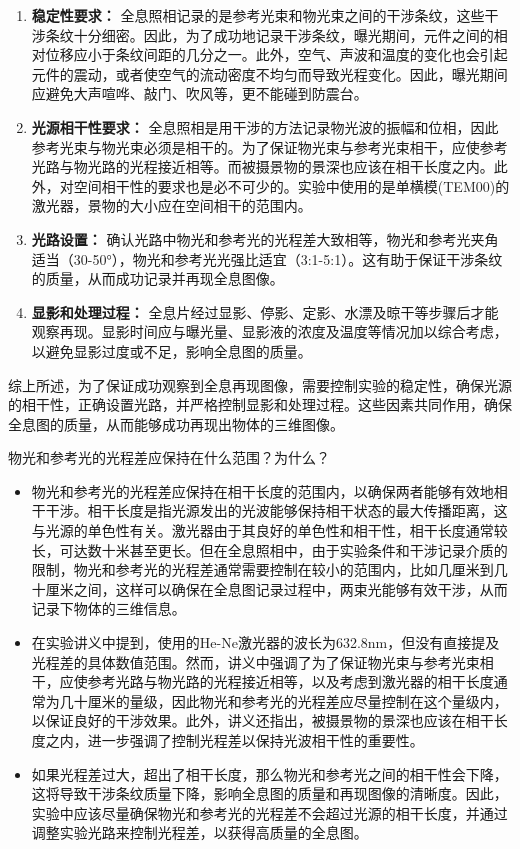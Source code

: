 \documentclass[dvipsnames, svgnames,a4paper,11pt]{article}
\begin{document}
	\begin{enumerate}
		\item \textbf{稳定性要求：} 全息照相记录的是参考光束和物光束之间的干涉条纹，这些干涉条纹十分细密。因此，为了成功地记录干涉条纹，曝光期间，元件之间的相对位移应小于条纹间距的几分之一。此外，空气、声波和温度的变化也会引起元件的震动，或者使空气的流动密度不均匀而导致光程变化。因此，曝光期间应避免大声喧哗、敲门、吹风等，更不能碰到防震台。
		
		\item \textbf{光源相干性要求：} 全息照相是用干涉的方法记录物光波的振幅和位相，因此参考光束与物光束必须是相干的。为了保证物光束与参考光束相干，应使参考光路与物光路的光程接近相等。而被摄景物的景深也应该在相干长度之内。此外，对空间相干性的要求也是必不可少的。实验中使用的是单横模(TEM00)的激光器，景物的大小应在空间相干的范围内。
		
		\item \textbf{光路设置：} 确认光路中物光和参考光的光程差大致相等，物光和参考光夹角适当（30-50°），物光和参考光光强比适宜（3:1-5:1）。这有助于保证干涉条纹的质量，从而成功记录并再现全息图像。
		
		\item \textbf{显影和处理过程：} 全息片经过显影、停影、定影、水漂及晾干等步骤后才能观察再现。显影时间应与曝光量、显影液的浓度及温度等情况加以综合考虑，以避免显影过度或不足，影响全息图的质量。
	\end{enumerate}
	
	综上所述，为了保证成功观察到全息再现图像，需要控制实验的稳定性，确保光源的相干性，正确设置光路，并严格控制显影和处理过程。这些因素共同作用，确保全息图的质量，从而能够成功再现出物体的三维图像。
	
	
	\begin{question}
		物光和参考光的光程差应保持在什么范围？为什么？
	\end{question}
	\begin{itemize}
		\item 物光和参考光的光程差应保持在相干长度的范围内，以确保两者能够有效地相干干涉。相干长度是指光源发出的光波能够保持相干状态的最大传播距离，这与光源的单色性有关。激光器由于其良好的单色性和相干性，相干长度通常较长，可达数十米甚至更长。但在全息照相中，由于实验条件和干涉记录介质的限制，物光和参考光的光程差通常需要控制在较小的范围内，比如几厘米到几十厘米之间，这样可以确保在全息图记录过程中，两束光能够有效干涉，从而记录下物体的三维信息。
		
		\item 在实验讲义中提到，使用的He-Ne激光器的波长为632.8nm，但没有直接提及光程差的具体数值范围。然而，讲义中强调了为了保证物光束与参考光束相干，应使参考光路与物光路的光程接近相等，以及考虑到激光器的相干长度通常为几十厘米的量级，因此物光和参考光的光程差应尽量控制在这个量级内，以保证良好的干涉效果。此外，讲义还指出，被摄景物的景深也应该在相干长度之内，进一步强调了控制光程差以保持光波相干性的重要性。
		
		\item 如果光程差过大，超出了相干长度，那么物光和参考光之间的相干性会下降，这将导致干涉条纹质量下降，影响全息图的质量和再现图像的清晰度。因此，实验中应该尽量确保物光和参考光的光程差不会超过光源的相干长度，并通过调整实验光路来控制光程差，以获得高质量的全息图。
	\end{itemize}
	
\end{document}
